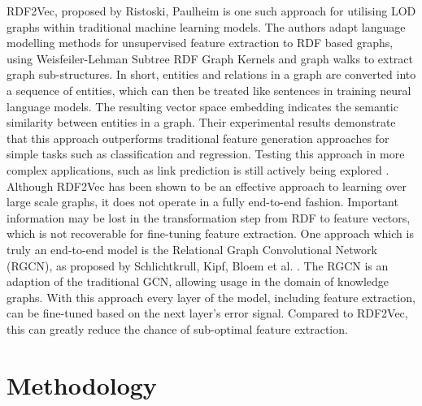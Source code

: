 \documentclass{article}
\begin{document}
RDF2Vec, proposed by Ristoski, Paulheim \cite{Ristoski2016RDF2VecRG} is one such approach for utilising LOD graphs within traditional machine learning models. The authors adapt language modelling methods for unsupervised feature extraction to RDF based graphs, using Weisfeiler-Lehman Subtree RDF Graph Kernels and graph walks to extract graph sub-structures. In short, entities and relations in a graph are converted into a sequence of entities, which can then be treated like sentences in training neural language models. The resulting vector space embedding indicates the semantic similarity between entities in a graph. Their experimental results demonstrate that this approach outperforms traditional feature generation approaches for simple tasks such as classification and regression. Testing this approach in more complex applications, such as link prediction is still actively being explored \cite{}.
\newline
Although RDF2Vec has been shown to be an effective approach to learning over large scale graphs, it does not operate in a fully end-to-end fashion. Important information may be lost in the transformation step from RDF to feature vectors, which is not recoverable for fine-tuning feature extraction.
\newline
One approach which is truly an end-to-end model is the Relational Graph Convolutional Network (RGCN), as proposed by Schlichtkrull, Kipf, Bloem et al. \cite{Schlichtkrull2018ModelingRD}. The RGCN is an adaption of the traditional GCN, allowing usage in the domain of knowledge graphs. With this approach every layer of the model, including feature extraction, can be fine-tuned based on the next layer's error signal. Compared to RDF2Vec, this can greatly reduce the chance of sub-optimal feature extraction.
\newline

\section{Methodology}
\end{document}

